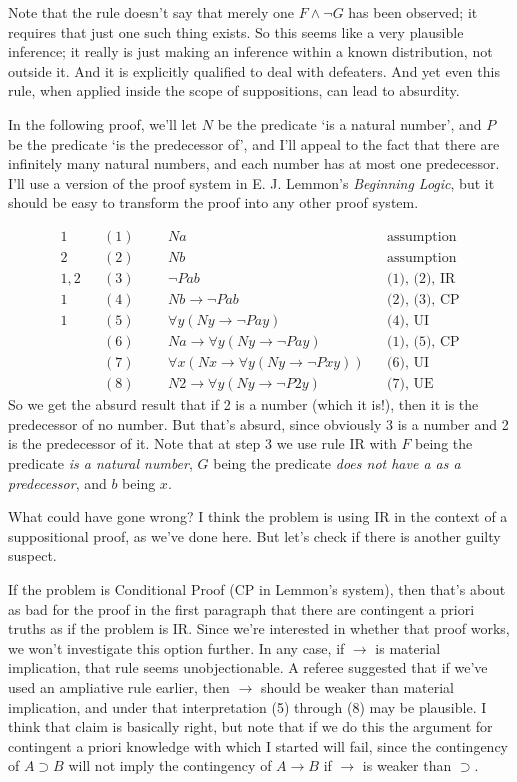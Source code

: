 \noindent Note that the rule doesn't say that merely one $F \wedge \neg G$ has been observed; it requires that just one such thing exists. So this seems like a very plausible inference; it really is just making an inference within a known distribution, not outside it. And it is explicitly qualified to deal with defeaters. And yet even this rule, when applied inside the scope of suppositions, can lead to absurdity. 

In the following proof, we'll let $N$ be the predicate `is a natural number', and $P$ be the predicate `is the predecessor of', and I'll appeal to the fact that there are infinitely many natural numbers, and each number has at most one predecessor. I'll use a version of the proof system in E. J. Lemmon's \textit{Beginning Logic}\nocite{Lemmon1978}, but it should be easy to transform the proof into any other proof system.

\begin{align}
1 && (1) && &Na && \text{assumption} \\
2 && (2) && &Nb && \text{assumption} \\
1, 2 && (3) && &\neg Pab && \text{(1), (2), IR} \\
1 && (4)  && &Nb \rightarrow \neg Pab && \text{(2), (3), CP} \\
1 && (5)  && &\forall y (Ny \rightarrow \neg Pay) && \text{(4), UI} \\
 && (6)  && &Na \rightarrow \forall y (Ny \rightarrow \neg Pay) && \text{(1), (5), CP} \\
 && (7) && &\forall x (Nx \rightarrow \forall y (Ny \rightarrow \neg Pxy)) && \text{(6), UI} \\
 && (8) && &N2 \rightarrow \forall y (Ny \rightarrow \neg P2y) && \text{(7), UE}
\end{align}
\noindent So we get the absurd result that if 2 is a number (which it is!), then it is the predecessor of no number. But that's absurd, since obviously 3 is a number and 2 is the predecessor of it. Note that at step 3 we use rule IR with $F$ being the predicate \textit{is a natural number},  $G$ being the predicate \textit{does not have a as a predecessor}, and $b$ being $x$. 

What could have gone wrong? I think the problem is using IR in the context of a suppositional proof, as we've done here. But let's check if there is another guilty suspect.

If the problem is Conditional Proof (CP in Lemmon's system), then that's about as bad for the proof in the first paragraph that there are contingent a priori truths as if the problem is IR. Since we're interested in whether that proof works, we won't investigate this option further. In any case, if $\rightarrow$ is material implication, that rule seems unobjectionable. A referee suggested that if we've used an ampliative rule earlier, then $\rightarrow$ should be weaker than material implication, and under that interpretation (5) through (8) may be plausible. I think that claim is basically right, but note that if we do this the argument for contingent a priori knowledge with which I started will fail, since the contingency of $A \supset B$ will not imply the contingency of $A \rightarrow B$ if $\rightarrow$ is weaker than $\supset$.


